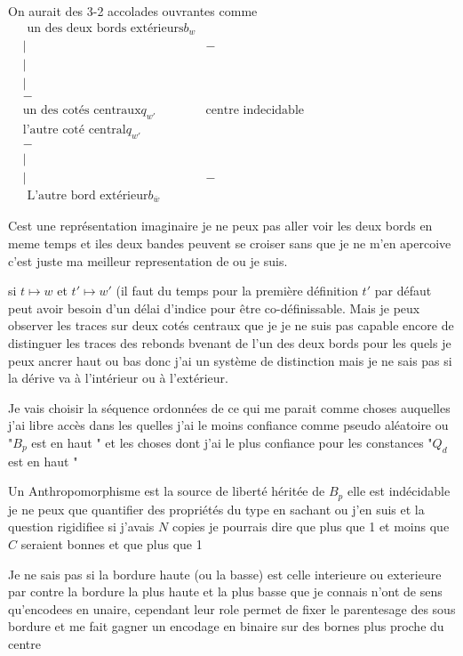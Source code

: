 \documentclass{article}
\begin{document}
On aurait des 3-2 accolades ouvrantes comme
 $\begin{matrix}
&\text{ un des deux bords extérieurs} b_w  &\\
& |&-\\
&| &\\
&|&\\
&-&\\
&\text {un des cotés centraux} q_{w'}
& \text{centre indecidable}\\
&\text {l'autre coté central} q_{w'}\\
&-&\\
&|&\\
&|&-\\
&\text{ L'autre bord extérieur} b_{\bar w}  
\end{matrix}$ 



Cest une représentation imaginaire je ne peux pas aller voir les deux bords en meme temps et iles deux bandes peuvent se croiser sans que je ne m'en apercoive 
c'est juste ma meilleur representation de ou je suis.

si $t \mapsto w$ et $ t'\mapsto w'$ (il faut du temps pour la première définition $t'$ par défaut peut avoir besoin d'un délai d'indice pour être co-définissable. Mais je peux observer les traces sur deux cotés centraux que je je ne suis pas capable encore de distinguer les traces des rebonds bvenant de l'un des deux bords pour les quels je peux ancrer haut ou bas donc j'ai un système de distinction mais je ne sais pas si la dérive va à l'intérieur ou à l'extérieur. 

Je vais choisir la séquence ordonnées de ce qui me parait comme  choses auquelles j'ai libre accès  dans les quelles j'ai le moins confiance comme   pseudo aléatoire ou "$B_p$ est en haut " 
 et les choses dont j'ai le plus confiance pour les constances "$Q_d$ est en haut " 

Un Anthropomorphisme est la source de liberté héritée de $B_p$ elle est indécidable je ne peux que quantifier des propriétés  du type en sachant ou j'en suis
et la question rigidifiee si j'avais $N$ copies je pourrais dire que plus que 1 et moins que $C $ seraient bonnes et que plus que 1   


Je ne sais pas si la bordure haute (ou la basse)  est celle interieure ou exterieure  par contre la bordure la plus haute et la plus basse que je connais n'ont de sens qu'encodees en unaire, cependant leur role permet de fixer le parentesage des sous bordure  et me fait gagner un encodage en binaire sur des bornes plus proche du centre
\end{document}
